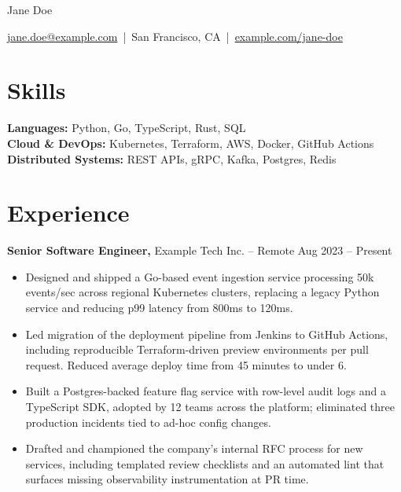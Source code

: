 \documentclass[11pt]{article}
\begin{document}
\centerline{\Huge Jane Doe}

\vspace{5pt}

\centerline{\href{mailto:jane.doe@example.com}{jane.doe@example.com} \,|\, San Francisco, CA \,|\, \href{https://example.com}{example.com/jane-doe}}

\vspace{-10pt}

\section*{Skills}
\textbf{Languages:} Python, Go, TypeScript, Rust, SQL \\
\textbf{Cloud \& DevOps:} Kubernetes, Terraform, AWS, Docker, GitHub Actions \\
\textbf{Distributed Systems:} REST APIs, gRPC, Kafka, Postgres, Redis

\vspace{-6.5pt}

\section*{Experience}

\textbf{Senior Software Engineer,} Example Tech Inc. -- Remote \hfill Aug 2023 -- Present \\
\vspace{-9pt}
\begin{itemize}
  \item Designed and shipped a Go-based event ingestion service processing 50k events/sec across regional Kubernetes clusters, replacing a legacy Python service and reducing p99 latency from 800ms to 120ms.
  \item Led migration of the deployment pipeline from Jenkins to GitHub Actions, including reproducible Terraform-driven preview environments per pull request. Reduced average deploy time from 45 minutes to under 6.
  \item Built a Postgres-backed feature flag service with row-level audit logs and a TypeScript SDK, adopted by 12 teams across the platform; eliminated three production incidents tied to ad-hoc config changes.
  \item Drafted and championed the company's internal RFC process for new services, including templated review checklists and an automated lint that surfaces missing observability instrumentation at PR time.
\end{itemize}
\end{document}
